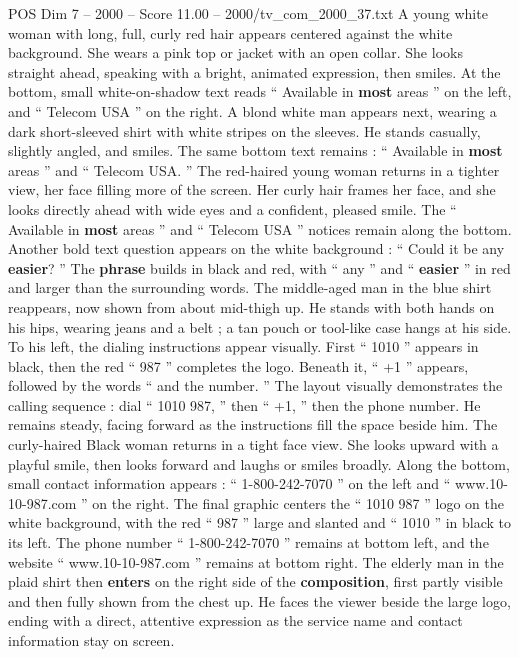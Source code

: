 \begin{textsample}{POS Dim 7 – 2000 – Score 11.00 – 2000/tv\_com\_2000\_37.txt}
A young white woman with long, full, curly red hair appears centered against the white background.
She wears a pink top or jacket with an open collar.
She looks straight ahead, speaking with a bright, animated expression, then smiles.
At the bottom, small white-on-shadow text reads “ Available in \textbf{most} areas ” on the left, and “ Telecom USA ” on the right.
A blond white man appears next, wearing a dark short-sleeved shirt with white stripes on the sleeves.
He stands casually, slightly angled, and smiles.
The same bottom text remains : “ Available in \textbf{most} areas ” and “ Telecom USA. ” The red-haired young woman returns in a tighter view, her face filling more of the screen.
Her curly hair frames her face, and she looks directly ahead with wide eyes and a confident, pleased smile.
The “ Available in \textbf{most} areas ” and “ Telecom USA ” notices remain along the bottom.
Another bold text question appears on the white background : “ Could it be any \textbf{easier}? ” The \textbf{phrase} builds in black and red, with “ any ” and “ \textbf{easier} ” in red and larger than the surrounding words.
The middle-aged man in the blue shirt reappears, now shown from about mid-thigh up.
He stands with both hands on his hips, wearing jeans and a belt ; a tan pouch or tool-like case hangs at his side.
To his left, the dialing instructions appear visually.
First “ 1010 ” appears in black, then the red “ 987 ” completes the logo.
Beneath it, “ +1 ” appears, followed by the words “ and the number. ” The layout visually demonstrates the calling sequence : dial “ 1010 987, ” then “ +1, ” then the phone number.
He remains steady, facing forward as the instructions fill the space beside him.
The curly-haired Black woman returns in a tight face view.
She looks upward with a playful smile, then looks forward and laughs or smiles broadly.
Along the bottom, small contact information appears : “ 1-800-242-7070 ” on the left and “ www.10-10-987.com ” on the right.
The final graphic centers the “ 1010 987 ” logo on the white background, with the red “ 987 ” large and slanted and “ 1010 ” in black to its left.
The phone number “ 1-800-242-7070 ” remains at bottom left, and the website “ www.10-10-987.com ” remains at bottom right.
The elderly man in the plaid shirt then \textbf{enters} on the right side of the \textbf{composition}, first partly visible and then fully shown from the chest up.
He faces the viewer beside the large logo, ending with a direct, attentive expression as the service name and contact information stay on screen.

\end{textsample}
